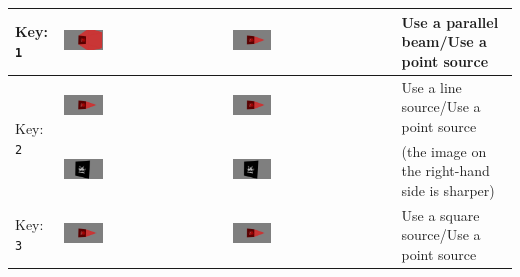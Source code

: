 \documentclass[10pt]{article}
\begin{document}
\begin{center}
\begin{longtable}{|m{}|m{}|m{}|m{}|}
		\hline
		Key: \texttt{1}	&	\includegraphics[width=0.25\textwidth]{parallel_beam.png}	&	\includegraphics[width=0.25\textwidth]{point_source.png}	&	Use a parallel beam/Use a point source\\
		\hline
		\multirow{2}{*}{Key: \texttt{2}}	&	\includegraphics[width=0.25\textwidth]{line_source.png}	&	\includegraphics[width=0.25\textwidth]{point_source.png}	&	Use a line source/Use a point source\\
			&	\includegraphics[width=0.25\textwidth]{line_source_xray.png}	&	\includegraphics[width=0.25\textwidth]{point_source_xray.png}	&	(the image on the right-hand side is sharper) \\
		\hline
		\multirow{2}{*}{Key: \texttt{3}}	&	\includegraphics[width=0.25\textwidth]{square_source.png}	&	\includegraphics[width=0.25\textwidth]{point_source.png}	&	Use a square source/Use a point source\\

\end{longtable}
\end{center}
\end{document}
